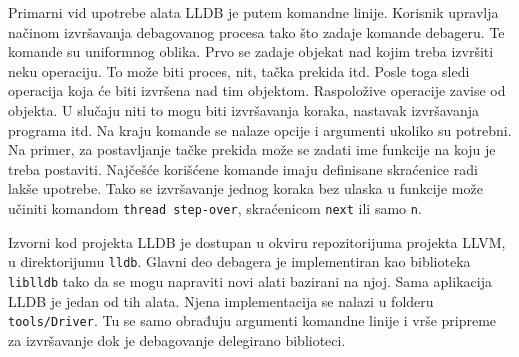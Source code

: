 \documentclass[12pt,oneside]{memoir}
\begin{document}
Primarni vid upotrebe alata LLDB je putem komandne linije.
Korisnik upravlja načinom izvršavanja debagovanog procesa tako što zadaje komande debageru.
Te komande su uniformnog oblika.
Prvo se zadaje objekat nad kojim treba izvršiti neku operaciju.
To može biti proces, nit, tačka prekida itd.
Posle toga sledi operacija koja će biti izvršena nad tim objektom.
Raspoložive operacije zavise od objekta.
U slučaju niti to mogu biti izvršavanja koraka, nastavak izvršavanja programa itd.
Na kraju komande se nalaze opcije i argumenti ukoliko su potrebni.
Na primer, za postavljanje tačke prekida može se zadati ime funkcije na koju je treba postaviti.
Najčešće korišćene komande imaju definisane skraćenice radi lakše upotrebe.
Tako se izvršavanje jednog koraka bez ulaska u funkcije može učiniti komandom \verb|thread step-over|, skraćenicom \verb|next| ili samo \verb|n|.



Izvorni kod projekta LLDB je dostupan u okviru repozitorijuma projekta LLVM, u direktorijumu \verb|lldb|.
Glavni deo debagera je implementiran kao biblioteka \verb|liblldb| tako da se mogu napraviti novi alati bazirani na njoj.
Sama aplikacija LLDB je jedan od tih alata.
Njena implementacija se nalazi u folderu \verb|tools/Driver|.
Tu se samo obrađuju argumenti komandne linije i vrše pripreme za izvršavanje dok je debagovanje delegirano biblioteci.
\end{document}
